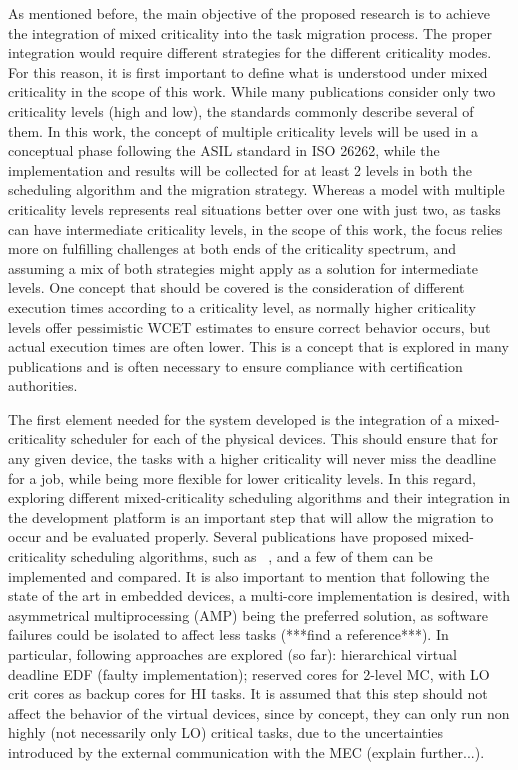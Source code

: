 As mentioned before, the main objective of the proposed research is to achieve the integration of mixed criticality into the task migration process. The proper integration would require different strategies for the different criticality modes. For this reason, it is first important to define what is understood under mixed criticality in the scope of this work. While many publications consider only two criticality levels (high and low), the standards commonly describe several of them. In this work, the concept of multiple criticality levels will be used in a conceptual phase following the ASIL standard in ISO 26262, while the implementation and results will be collected for at least 2 levels in both the scheduling algorithm and the migration strategy. Whereas a model with multiple criticality levels represents real situations better over one with just two, as tasks can have intermediate criticality levels, in the scope of this work, the focus relies more on fulfilling challenges at both ends of the criticality spectrum, and assuming a mix of both strategies might apply as a solution for intermediate levels. One concept that should be covered is the consideration of different execution times according to a criticality level, as normally higher criticality levels offer pessimistic WCET estimates to ensure correct behavior occurs, but actual execution times are often lower. This is a concept that is explored in many publications and is often necessary to ensure compliance with certification authorities.

The first element needed for the system developed is the integration of a mixed-criticality scheduler for each of the physical devices. This should ensure that for any given device, the tasks with a higher criticality will never miss the deadline for a job, while being more flexible for lower criticality levels. In this regard, exploring different mixed-criticality scheduling algorithms and their integration in the development platform is an important step that will allow the migration to occur and be evaluated properly. Several publications have proposed mixed-criticality scheduling algorithms, such as ~\parencite{baruah1, fleming1, zhao1, baruah2, lili1}, and a few of them can be implemented and compared. It is also important to mention that following the state of the art in embedded devices, a multi-core implementation is desired, with asymmetrical multiprocessing (AMP) being the preferred solution, as software failures could be isolated to affect less tasks (***find a reference***). In particular, following approaches are explored (so far): hierarchical virtual deadline EDF (faulty implementation); reserved cores for 2-level MC, with LO crit cores as backup cores for HI tasks. It is assumed that this step should not affect the behavior of the virtual devices, since by concept, they can only run non highly (not necessarily only LO) critical tasks, due to the uncertainties introduced by the external communication with the MEC (explain further...).

